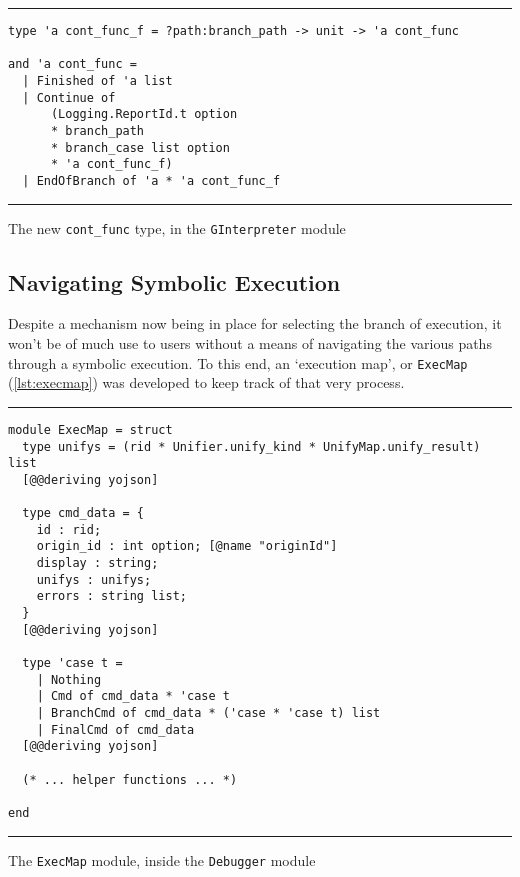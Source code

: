 \begin{listing}[!ht]
\noindent\rule{\textwidth}{0.5pt}
\vspace{-0.6cm}
\begin{verbatim}
type 'a cont_func_f = ?path:branch_path -> unit -> 'a cont_func

and 'a cont_func =
  | Finished of 'a list
  | Continue of
      (Logging.ReportId.t option
      * branch_path
      * branch_case list option
      * 'a cont_func_f)
  | EndOfBranch of 'a * 'a cont_func_f
\end{verbatim}
\vspace{-0.4cm}
\noindent\rule{\textwidth}{0.5pt}
\vspace{-0.6cm}
\caption{The new \texttt{cont\_func} type, in the \texttt{GInterpreter} module}
\label{lst:contfunc-type-new}
\end{listing}


\subsection{Navigating Symbolic Execution}%
\label{sec:navigating-symex}

Despite a mechanism now being in place for selecting the branch of execution, it
won't be of much use to users without a means of navigating the various paths
through a symbolic execution. To this end, an `execution map', or
\texttt{ExecMap} (\autoref{lst:execmap}) was developed to keep track of that
very process.

\begin{listing}[!ht]
\noindent\rule{\textwidth}{0.5pt}
\vspace{-0.6cm}
\begin{verbatim}
module ExecMap = struct
  type unifys = (rid * Unifier.unify_kind * UnifyMap.unify_result) list
  [@@deriving yojson]

  type cmd_data = {
    id : rid;
    origin_id : int option; [@name "originId"]
    display : string;
    unifys : unifys;
    errors : string list;
  }
  [@@deriving yojson]

  type 'case t =
    | Nothing
    | Cmd of cmd_data * 'case t
    | BranchCmd of cmd_data * ('case * 'case t) list
    | FinalCmd of cmd_data
  [@@deriving yojson]

  (* ... helper functions ... *)

end
\end{verbatim}
\vspace{-0.4cm}
\noindent\rule{\textwidth}{0.5pt}
\vspace{-0.6cm}
\caption{The \texttt{ExecMap} module, inside the \texttt{Debugger} module}
\label{lst:execmap}
\end{listing}

